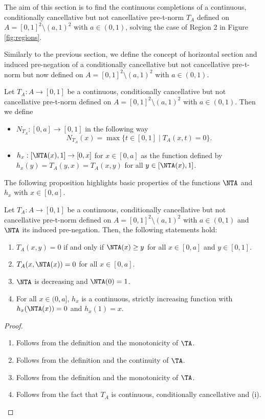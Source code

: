 The aim of this section is to find the continuous completions of a continuous, conditionally cancellative but not cancellative pre-t-norm $T_A$ defined on $A=[0,1]^2 \setminus (a,1)^2$ with $a \in (0,1)$, solving the case of Region 2 in Figure \ref{fig:regions}.

Similarly to the previous section,  we define the concept of horizontal section and induced pre-negation of a conditionally cancellative but not cancellative pre-t-norm but now defined on $A=[0,1]^2 \setminus (a,1)^2$ with $a \in (0,1)$.
\begin{definition}
	Let $T_A:A \to [0,1]$ be a continuous, conditionally cancellative but not cancellative pre-t-norm defined on $A=[0,1]^2 \setminus (a,1)^2$ with $a \in (0,1)$. Then we define
	\begin{itemize}
		\item $N_{T_A} : [0,a] \to [0,1]$ in the following way
		$$ N_{T_A}(x)= \max \{ t \in [0,1] \mid T_A(x,t)=0\}.$$
		\item $h_x:[\NTA(x),1] \to [0,x]$ for $x \in [0,a]$ as the function defined by $h_x(y)=T_A(y,x)=T_A(x,y)$ for all $y \in [\NTA(x),1]$.\\
		
	\end{itemize}
\end{definition}

The following proposition highlights basic properties of the functions $\NTA$ and $h_x$ with $x \in [0,a]$.

\begin{proposition}\label{prop:(a,1)propNTA1}
	Let $T_A:A \to [0,1]$ be a continuous, conditionally cancellative but not cancellative pre-t-norm defined on $A=[0,1]^2 \setminus (a,1)^2$ with $a \in (0,1)$ and $\NTA$ its induced pre-negation. Then, the following statements hold:
	\begin{enumerate}[label=(\roman*)]
		\item $T_A(x,y)=0$ if and only if $\NTA(x) \geq y$ for all $x \in [0,a]$ and $y \in [0,1]$.
		\item $T_A(x,\NTA(x))=0$ for all $x \in [0,a]$.
		\item $\NTA$ is decreasing and $\NTA(0)=1$.
		\item For all $x \in (0,a]$, $h_x$ is a continuous, strictly increasing function with $h_x(\NTA(x))=0$ and $h_x(1)=x$.
	\end{enumerate}
\end{proposition}
\begin{proof}
	\begin{enumerate}[label=(\roman*)]
		\item Follows from the definition and the monotonicity of $\TA$.
		\item Follows from the definition and the continuity of $\TA$.
		\item Follows from the definition and the monotonicity of $\TA$.
		\item Follows from the fact that $T_A$ is continuous, conditionally cancellative and (i).
	\end{enumerate}
\end{proof}

